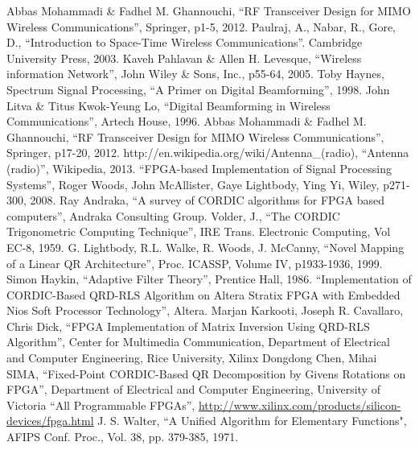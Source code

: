\begin{thebibliography}{99}

 Abbas Mohammadi \& Fadhel M. Ghannouchi, ``RF Transceiver Design for MIMO Wireless Communications'', Springer, p1-5, 2012.
 Paulraj, A., Nabar, R., Gore, D., ``Introduction to Space-Time Wireless Communications''. Cambridge University Press, 2003.
 Kaveh Pahlavan \& Allen H. Levesque, ``Wireless information Network'', John Wiley \& Sons, Inc., p55-64, 2005.
 Toby Haynes, Spectrum Signal Processing, ``A Primer on Digital Beamforming'', 1998.
 John Litva \& Titus Kwok-Yeung Lo, ``Digital Beamforming in Wireless Communications'', Artech House, 1996.
 Abbas Mohammadi \& Fadhel M. Ghannouchi, ``RF Transceiver Design for MIMO Wireless Communications'', Springer, p17-20, 2012.
 http://en.wikipedia.org/wiki/Antenna\_(radio), ``Antenna (radio)'', Wikipedia, 2013.
 ``FPGA-based Implementation of Signal Processing Systems'', Roger Woods, John McAllister, Gaye Lightbody, Ying Yi, Wiley, p271-300, 2008.
 Ray Andraka, ``A survey of CORDIC algorithms for FPGA based computers'', Andraka Consulting Group.
 Volder, J., ``The CORDIC Trigonometric Computing Technique'', IRE Trans. Electronic Computing, Vol EC-8, 1959.
 G. Lightbody, R.L. Walke, R. Woods, J. McCanny, ``Novel Mapping of a Linear QR Architecture'', Proc. ICASSP, Volume IV, p1933-1936, 1999.
 Simon Haykin, ``Adaptive Filter Theory'', Prentice Hall, 1986.
 ``Implementation of CORDIC-Based QRD-RLS Algorithm on Altera Stratix FPGA with Embedded Nios Soft Processor Technology'', Altera.
 Marjan Karkooti, Joseph R. Cavallaro, Chris Dick, ``FPGA Implementation of Matrix Inversion Using QRD-RLS Algorithm'', Center for Multimedia Communication, Department of Electrical and Computer Engineering, Rice University, Xilinx
 Dongdong Chen, Mihai SIMA, ``Fixed-Point CORDIC-Based QR Decomposition by Givens Rotations on FPGA'', Department of Electrical and Computer Engineering, University of Victoria
 ``All Programmable FPGAs'', \href{http://www.xilinx.com/products/silicon-devices/fpga.html}{http://www.xilinx.com/products/silicon-devices/fpga.html}
 J. S. Walter, ``A Unified Algorithm for Elementary Functions", AFIPS Conf. Proc., Vol. 38, pp. 379-385, 1971.

\end{thebibliography}
